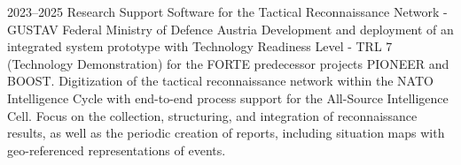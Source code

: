 \cventry
{2023--2025}
{Research}
{Support Software for the Tactical Reconnaissance Network - GUSTAV}
{Federal Ministry of Defence}
{Austria}
{
  Development and deployment of an integrated system prototype with
  Technology Readiness Level - TRL 7 (Technology Demonstration) for the FORTE predecessor projects PIONEER and BOOST.
  Digitization of the tactical reconnaissance network within the NATO Intelligence Cycle
  with end-to-end process support for the All-Source Intelligence Cell.
  Focus on the collection, structuring, and integration of reconnaissance results, as well as the periodic creation
  of reports, including situation maps with geo-referenced representations of events.
}
